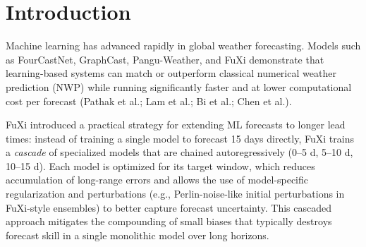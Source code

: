 \documentclass[12pt]{report}
\begin{document}
\begin{abstract}
We present a FuXi-inspired deep learning pipeline for single-step (6-hour) global weather forecasting on a $1.5^\circ$ ERA5 grid ($240\times121$), after initial smoke experiments on a coarser $64\times32$ setup. The model ingests two consecutive timesteps and predicts the next state for 20 channels (five surface and fifteen upper-air features). The architecture combines a 3D cube embedding, a reduced-depth Swin Transformer V2 encoder for hierarchical global context, and a U-Net-style decoder for spatial reconstruction. In the current implementation, decoder upsampling uses learned transposed convolutions, while a final $1\times1$ projection plus bilinear resize is retained for exact output-grid alignment.

Training was stable overall, but skill remained sensitive to architecture depth, horizon length, and fine-tuning strategy. I present evaluation metrics (RMSE, ACC, latitude-weighted L1), qualitative comparison plots, and per-variable error analyses. I also tested full fine-tuning and PEFT/LoRA variants under multiple configurations; in the present runs, LoRA variants underperformed the strongest non-LoRA checkpoint on long-horizon metrics. Future extensions include deeper architecture sweeps at higher resolution, better PEFT targeting, stronger long-horizon regularization, and ensemble uncertainty estimation.
\end{abstract}

\chapter{Introduction}

Machine learning has advanced rapidly in global weather forecasting. Models such as FourCastNet, GraphCast, Pangu-Weather, and FuXi demonstrate that learning-based systems can match or outperform classical numerical weather prediction (NWP) while running significantly faster and at lower computational cost per forecast (Pathak et al.; Lam et al.; Bi et al.; Chen et al.).

FuXi introduced a practical strategy for extending ML forecasts to longer lead times: instead of training a single model to forecast 15 days directly, FuXi trains a \emph{cascade} of specialized models that are chained autoregressively (0--5 d, 5--10 d, 10--15 d). Each model is optimized for its target window, which reduces accumulation of long-range errors and allows the use of model-specific regularization and perturbations (e.g., Perlin-noise-like initial perturbations in FuXi-style ensembles) to better capture forecast uncertainty. This cascaded approach mitigates the compounding of small biases that typically destroys forecast skill in a single monolithic model over long horizons.
\end{document}
